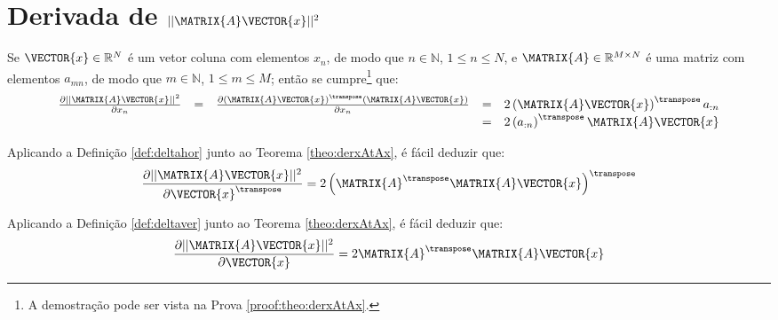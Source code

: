 
\section{Derivada de $||\MATRIX{A}\VECTOR{x}||^2$ 
}

\begin{theorem}\label{theo:derxAtAx}
Se 
$\VECTOR{x}\in \mathbb{R}^N$ é um vetor coluna com elementos $x_n$, de modo que
$n\in \mathbb{N}$, $1 \leq n \leq N$, e 
$\MATRIX{A} \in \mathbb{R}^{M\times N}$ é uma matriz com elementos $a_{mn}$, de modo que
$m\in \mathbb{N}$, $1 \leq m \leq M$; 
então se cumpre\footnote{A demostração pode ser vista na Prova \ref{proof:theo:derxAtAx}.} que:
\begin{equation}
\begin{matrix}
\frac{\partial ||\MATRIX{A}\VECTOR{x}||^2 }{\partial x_n}&=&
\frac{\partial \left(\MATRIX{A}\VECTOR{x}\right)^{\transpose}\left(\MATRIX{A}\VECTOR{x}\right)}{\partial x_n}&=&
2\left(\MATRIX{A}\VECTOR{x}\right)^{\transpose}a_{:n}\\
~&~&~&=& 2\left(a_{:n}\right)^{\transpose}\MATRIX{A}\VECTOR{x}
\end{matrix}
\end{equation}
\end{theorem}

\begin{corollary}\label{coro:derxAtAx1}
Aplicando a Definição \ref{def:deltahor} junto ao Teorema \ref{theo:derxAtAx}, é
fácil deduzir que:
\begin{equation}
\frac{\partial ||\MATRIX{A}\VECTOR{x}||^2 }{\partial \VECTOR{x}^{\transpose}}=
2\left(\MATRIX{A}^{\transpose}\MATRIX{A}\VECTOR{x}\right)^{\transpose}
\end{equation}
\end{corollary}

\begin{corollary}\label{coro:derxAtAx2}
Aplicando a Definição \ref{def:deltaver} junto ao Teorema \ref{theo:derxAtAx}, é
fácil deduzir que:
\begin{equation}
\frac{\partial ||\MATRIX{A}\VECTOR{x}||^2 }{\partial \VECTOR{x}}=
2 \MATRIX{A}^{\transpose}\MATRIX{A}\VECTOR{x}
\end{equation}
\end{corollary}
